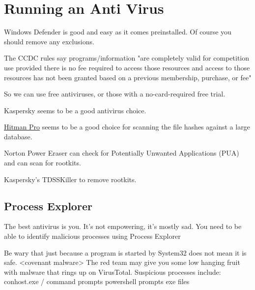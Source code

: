 \documentclass{article}
\begin{document}
\section{Running an Anti Virus}
Windows Defender is good and easy as it comes preinstalled. Of course you should remove any exclusions.

The CCDC rules say programs/information "are completely valid for competition use provided there is no 
fee required to access those resources and access to 
those resources has not been granted based on a previous membership, purchase, or fee"

So we can use free antiviruses, or those with a no-card-required free trial.

Kaspersky seems to be a good antivirus choice.

\href{https://www.sophos.com/en-us/free-tools/hitmanpro}{Hitman Pro} seems to be a good choice for scanning the file hashes against a large database.

Norton Power Eraser can check for Potentially Unwanted Applications (PUA) and can scan for rootkits.

Kaspersky's TDSSKiller to remove rootkits.

\subsection{Process Explorer}
The best antivirus is you. It's not empowering, it's mostly sad.
You need to be able to identify malicious processes using Process Explorer

Be wary that just because a program is started by System32 does not mean it is safe. <covenant malware>
The red team may give you some low hanging fruit with malware that rings up on VirusTotal.
Suspicious processes include:
conhost.exe / command prompts
powershell prompts
exe files
\end{document}

